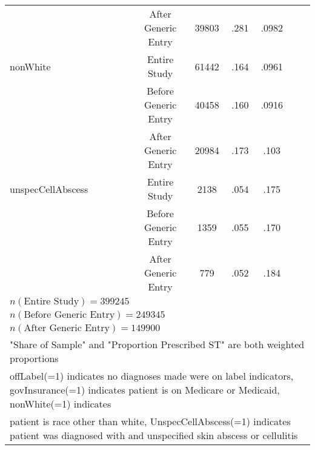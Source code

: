 \begin{table}[htbp]
\begin{tabular}{l*{6}{c}}
                          &     After Generic Entry&      39803 &      .281&     .0982\\
[1em]
nonWhite                  &     Entire Study&             61442&      .164&     .0961\\
                          &     Before Generic Entry&     40458&      .160&     .0916\\
                          &     After Generic Entry&      20984&      .173&     .103\\
[1em]
unspecCellAbscess         &     Entire Study&             2138 &      .054&     .175\\
                          &     Before Generic Entry&     1359 &      .055&     .170\\
                          &     After Generic Entry&      779  &      .052&     .184\\
\hline
$n(\text{Entire Study}) = 399245$\\
$n(\text{Before Generic Entry}) = 249345$\\
$n(\text{After Generic Entry}) = 149900$\\
\hline\hline
\multicolumn{7}{l}{"Share of Sample" and "Proportion Prescribed ST" are both weighted proportions}\\
\multicolumn{7}{l}{offLabel(=1) indicates no diagnoses made were on label indicators, govInsurance(=1) indicates patient is on Medicare or Medicaid, nonWhite(=1) indicates}\\
\multicolumn{7}{l}{patient is race other than white, UnspecCellAbscess(=1) indicates patient was diagnosed with and unspecified skin abscess or cellulitis}\\
\end{tabular}
\label{tab:Table4.2}
\end{table}
